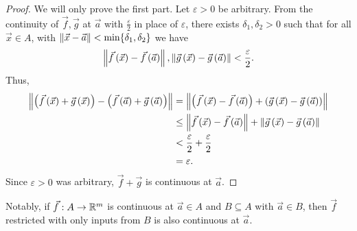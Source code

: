 \documentclass[main.tex]{subfiles}
\begin{document}
\begin{proof}
    We will only prove the first part. Let $\varepsilon > 0$ be arbitrary. From the continuity of $\vec{f}, \vec{g}$ at $\vec{a}$ with $\frac{\varepsilon}{2}$ in place of $\varepsilon$, there exists $\delta_1, \delta_2 > 0$ such that for all $\vec{x}\in A$, with $\left\lVert \vec{x} - \vec{a} \right\rVert < \min\{\delta_1, \delta_2\}$ we have
    \[\left\lVert \vec{f}\left( \vec{x} \right) - \vec{f}\left( \vec{a} \right) \right\rVert, \left\lVert \vec{g}\left( \vec{x} \right) - \vec{g}\left( \vec{a} \right) \right\rVert < \frac{\varepsilon}{2}.\]
    Thus,
    \begin{align*}
        \left\lVert \left( \vec{f}\left( \vec{x} \right) + \vec{g}\left( \vec{x} \right) \right) - \left( \vec{f}\left( \vec{a} \right) + \vec{g}\left( \vec{a} \right) \right) \right\rVert &= 
        \left\lVert \left( \vec{f}\left( \vec{x} \right) - \vec{f}\left( \vec{a} \right) \right) + \left( \vec{g}\left( \vec{x} \right) - \vec{g}\left( \vec{a} \right) \right) \right\rVert \\
        &\le \left\lVert \vec{f}\left( \vec{x} \right) - \vec{f}\left( \vec{a} \right) \right\rVert + \left\lVert \vec{g}\left( \vec{x} \right) - \vec{g}\left( \vec{a} \right) \right\rVert \\
        &< \frac{\varepsilon}{2} + \frac{\varepsilon}{2} \\
        &= \varepsilon.
    \end{align*}
    Since $\varepsilon > 0$ was arbitrary, $\vec{f} + \vec{g}$ is continuous at $\vec{a}$.
\end{proof}

Notably, if $\vec{f} : A\to \mathbb R^m$ is continuous at $\vec{a}\in A$ and $B\subseteq A$ with $\vec{a}\in B$, then $\vec{f}$ restricted with only inputs from $B$ is also continuous at $\vec{a}$.
\end{document}
